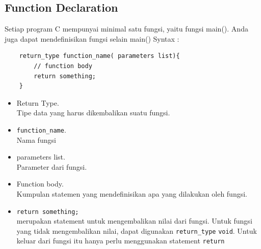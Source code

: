 \subsection{Function Declaration}
Setiap program C mempunyai minimal satu fungsi, yaitu fungsi main(). Anda juga dapat mendefinisikan fungsi selain main()
Syntax :
\begin{verbatim}
    return_type function_name( parameters list){
        // function body
    	return something;
    }
\end{verbatim}
\begin{itemize}
	\item Return Type.\\ Tipe data yang harus dikembalikan suatu fungsi.
    \item \verb*|function_name|.\\ Nama fungsi
    \item parameters list.\\ 
    Parameter dari fungsi.
    \item Function body.\\ Kumpulan statemen yang mendefinisikan apa yang dilakukan oleh fungsi.
    \item \verb|return something;|\\ merupakan statement untuk mengembalikan nilai dari fungsi. Untuk fungsi yang tidak mengembalikan nilai, dapat digunakan \verb|return_type| \verb|void|. Untuk keluar dari fungsi itu hanya perlu menggunakan statement \verb*|return|
\end{itemize}  

